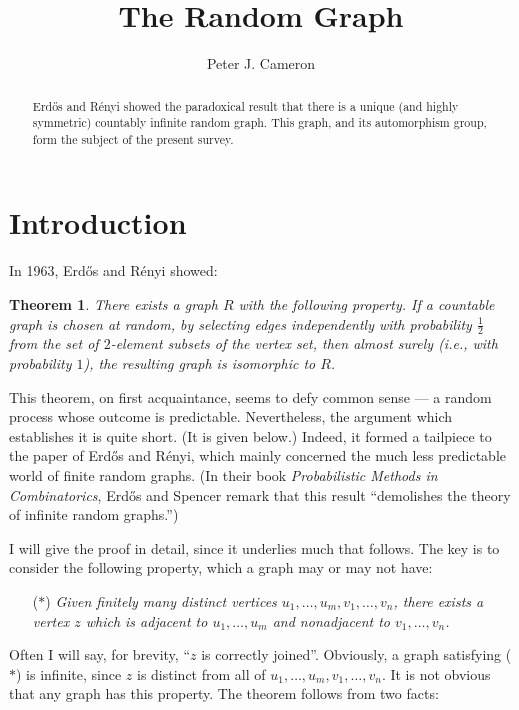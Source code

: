 \documentclass[12pt]{article}
\newtheorem{theorem}{Theorem}
\begin{document}
\title{\Large The Random Graph}
\date{}
\author{Peter J. Cameron}
\label{ch32:chap32}
\maketitle

%

\maketitle

\begin{abstract}
\noindent
Erd\H{o}s and R\'{e}nyi showed the paradoxical
result that there is a unique (and highly symmetric) countably
infinite random graph. This graph, and its automorphism group, form
the subject of the present survey.
\end{abstract}
\section{Introduction}%
\label{ch32:sec2.1}

In 1963, Erd\H{o}s and R\'{e}nyi \cite{ch32:bib18} showed:
\begin{theorem}\label{ch32:them1.1} 
There exists a graph $R$ with the following
property. If a countable graph is chosen at random, by selecting
edges independently with probability $\frac{1}{2}$ from the set of
$2$-element subsets of the vertex set, then almost surely (i.e., with
probability $1$), the resulting graph is isomorphic to $R$.
\end{theorem}

This theorem, on first acquaintance, seems to defy common sense --- a
random process whose outcome is predictable. Nevertheless, the
argument which establishes it is quite short. (It is given below.)
Indeed, it formed a tailpiece to the paper of Erd\H{o}s and
R\'{e}nyi, which mainly concerned the much less predictable world of
finite random graphs. (In their book \emph{Probabilistic Methods in
Combinatorics}, Erd\H{o}s and Spencer \cite{ch32:bib19} remark that
this result ``demolishes the theory of infinite random graphs.'')

I will give the proof in detail, since it underlies much that
follows. The key is to consider the following property, which a
graph may or may not have:
\begin{itemize}
\item[($\ast$)] \emph{Given finitely many distinct vertices $u_1, \ldots, u_m, v_1, \ldots, v_n$, there exists a vertex $z$ which is adjacent to $u_1,\ldots, u_m$ and nonadjacent to $v_1,\ldots,v_n$.}
\end{itemize}
Often I will say, for brevity, ``$z$ is correctly joined''.
Obviously, a graph satisfying ($\ast$) is infinite, since $z$ is
distinct from all of $u_1, \ldots, u_m, v_1, \ldots, v_n$. It is
not obvious that any graph has this property. The theorem follows
from two facts:
\end{document}
